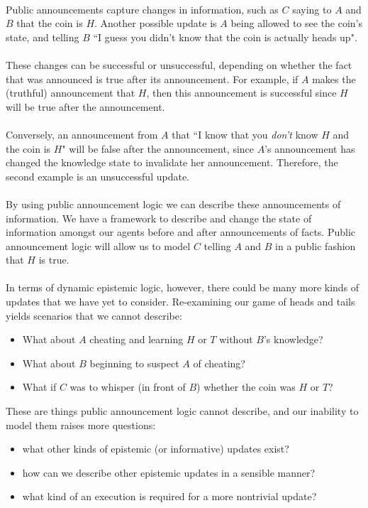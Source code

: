\documentclass[12pt, a4paper, titlepage]{scrartcl}
\begin{document}
\\
Public announcements capture changes in information, such as $C$ saying to
$A$ and $B$ that the coin is $H$.
Another possible update is $A$ being allowed to see the coin's state, and
telling $B$ ``I guess you didn't know that the coin is actually heads up".\\
\\
These changes can be successful or unsuccessful, depending on whether the fact
that was announced is true after its announcement.
For example, if $A$ makes the (truthful) announcement that $H$, then this
announcement is successful since $H$ will be true after the announcement.\\
\\
Conversely, an announcement from $A$ that ``I know that you {\em don't} know $H$
and the coin is $H$" will be false after the announcement, since $A$'s
announcement has changed the knowledge state to invalidate her
announcement.
Therefore, the second example is an unsuccessful update.\\
\\
By using public announcement logic we can describe these announcements of
information.
We have a framework to describe and change the state of information amongst our
agents before and after announcements of facts.
Public announcement logic will allow us to model $C$ telling $A$ and $B$ in a
public fashion that $H$ is true.\\
\\
In terms of dynamic epistemic logic, however, there could be many more kinds of
updates that we have yet to consider.
Re-examining our game of heads and tails yields scenarios that we cannot
describe:
\begin{itemize}
	\item What about $A$ cheating and learning $H$ or $T$ without $B$'s knowledge?
	\item What about $B$ beginning to suspect $A$ of cheating?
	\item What if $C$ was to whisper (in front of $B$) whether the coin was $H$
	or $T$?
\end{itemize}
These are things public announcement logic cannot describe, and our inability to
model them raises more questions:
\begin{itemize}
	\item what other kinds of epistemic (or informative) updates exist?
	\item how can we describe other epistemic updates in a sensible manner?
	\item what kind of an execution is required for a more nontrivial update?
\end{itemize}
\end{document}
